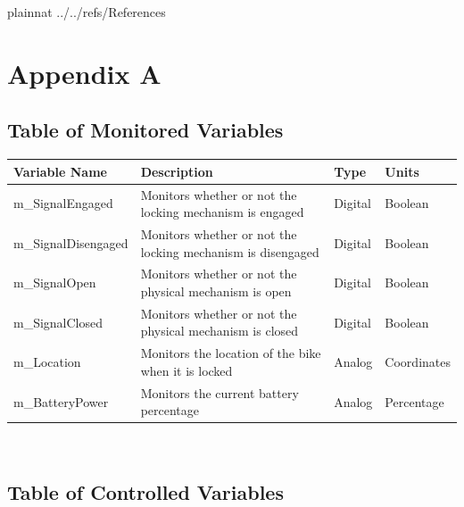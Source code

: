 \documentclass[12pt]{article}
\begin{document}

\newpage

 {plainnat}
 {../../refs/References}

\newpage

\newpage{}
\section{Appendix A}

\subsection{Table of Monitored Variables}

\begin{minipage}{\textwidth}
\renewcommand*{\arraystretch}{1.5}
\begin{tabular}{| p{} | p{} | p{} | p{} |}
 \hline
 Variable Name & Description & Type & Units \\ 
 \hline
 m\_SignalEngaged & Monitors whether or not the locking mechanism is engaged & Digital & Boolean \\ 
  \hline
 m\_SignalDisengaged & Monitors whether or not the locking mechanism is disengaged & Digital & Boolean \\ 
  \hline
 m\_SignalOpen & Monitors whether or not the physical mechanism is open & Digital & Boolean \\ 
  \hline
 m\_SignalClosed& Monitors whether or not the physical mechanism is closed & Digital & Boolean \\ 
  \hline
 m\_Location & Monitors the location of the bike when it is locked & Analog & Coordinates \\ 
  \hline
 m\_BatteryPower & Monitors the current battery percentage & Analog & Percentage \\ 
 \hline
\end{tabular}
\end{minipage}\\

\subsection{Table of Controlled Variables}
\end{document}
